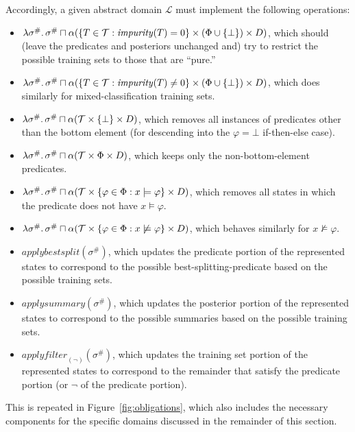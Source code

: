 Accordingly, a given abstract domain $\mathcal{L}$ must implement the following operations:
\begin{itemize}
    \item $\lambda \sigma^\# \ldotp \sigma^\# \sqcap
        \alpha(\{T \in \mathcal{T} : \mathit{impurity}(T) = 0\} \times (\Phi \cup \{\bot\}) \times D)$,
        which should (leave the predicates and posteriors unchanged and)
        try to restrict the possible training sets to those that are ``pure.''
    \item $\lambda \sigma^\# \ldotp \sigma^\# \sqcap
        \alpha(\{T \in \mathcal{T} : \mathit{impurity}(T) \neq 0\} \times (\Phi \cup \{\bot\}) \times D)$,
        which does similarly for mixed-classification training sets.
    \item $\lambda \sigma^\# \ldotp \sigma^\# \sqcap
        \alpha(\mathcal{T} \times \{\bot\} \times D)$,
        which removes all instances of predicates other than the bottom element
        (for descending into the $\varphi = \bot$ if-then-else case).
    \item $\lambda \sigma^\# \ldotp \sigma^\# \sqcap
        \alpha(\mathcal{T} \times \Phi \times D)$,
        which keeps only the non-bottom-element predicates.
    \item $\lambda \sigma^\# \ldotp \sigma^\# \sqcap
        \alpha(\mathcal{T} \times \{\varphi \in \Phi : x \models \varphi\} \times D)$,
        which removes all states in which the predicate does not have $x \models \varphi$.
    \item $\lambda \sigma^\# \ldotp \sigma^\# \sqcap
        \alpha(\mathcal{T} \times \{\varphi \in \Phi : x \not\models \varphi\} \times D)$,
        which behaves similarly for $x \not\models \varphi$.
    \item $\mathit{applybestsplit}(\sigma^\#)$,
        which updates the predicate portion of the represented states
        to correspond to the possible best-splitting-predicate
        based on the possible training sets.
    \item $\mathit{applysummary}(\sigma^\#)$,
        which updates the posterior portion of the represented states
        to correspond to the possible summaries
        based on the possible training sets.
    \item $\mathit{applyfilter}_{(\lnot)}(\sigma^\#)$,
        which updates the training set portion of the represented states
        to correspond to the remainder that satisfy the predicate portion
        (or $\lnot$ of the predicate portion).
\end{itemize}
This is repeated in Figure~\ref{fig:obligations},
which also includes the necessary components for the
specific domains discussed in the remainder of this section.

